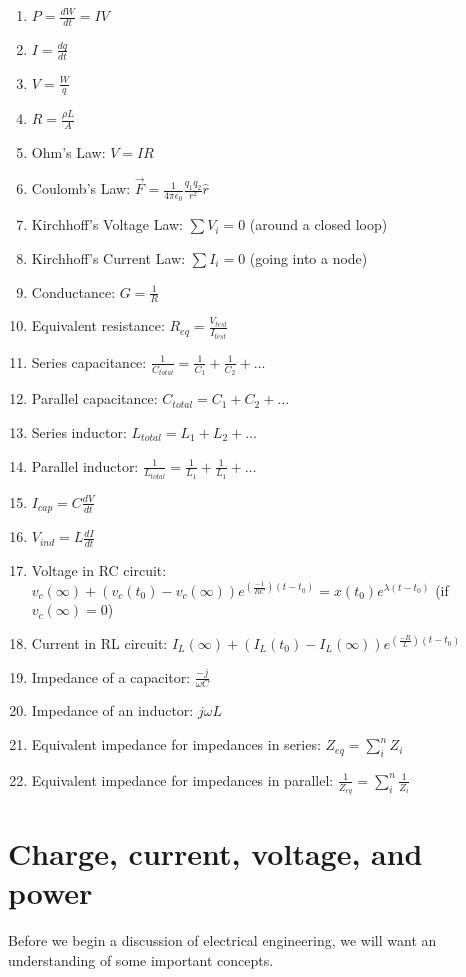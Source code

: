 \documentclass[nobib]{tufte-handout}
\begin{document}
\begin{enumerate}
    \item $P = \frac{dW}{dt} = IV$
    \item $I = \frac{dq}{dt}$
    \item $V = \frac{W}{q}$
    \item $R = \frac{\rho L}{A}$
    \item Ohm's Law: $V=IR$
    \item Coulomb's Law: $\vec{F} = \frac{1}{4\pi \epsilon_0}\frac{q_1 q_2}{r^2}\hat{r}$
    \item Kirchhoff's Voltage Law: $\sum V_i = 0$ (around a closed loop)
    \item Kirchhoff's Current Law: $\sum I_i = 0$ (going into a node)
    \item Conductance: $G = \frac{1}{R}$
    \item Equivalent resistance: $R_{eq} = \frac{V_{test}}{I_{test}}$
    \item Series capacitance: $\frac{1}{C_{total}} = \frac{1}{C_1} + \frac{1}{C_2} + \dots$
    \item Parallel capacitance: $C_{total} = C_1 + C_2 + \dots$
    \item Series inductor: $L_{total} = L_1+L_2+\dots$
    \item Parallel inductor: $\frac{1}{L_{total}} = \frac{1}{L_1} + \frac{1}{L_1} + \dots$
    \item $I_{cap} = C \frac{dV}{dt}$
    \item $V_{ind} = L \frac{dI}{dt}$
    \item Voltage in RC circuit: 
    $v_c(\infty) +\left(v_c(t_0) - v_c(\infty)\right)e^{(\frac{-1}{RC})(t - t_0)} = x(t_0)e^{\lambda (t-t_0)}$
    (if $v_c(\infty) = 0$)
    \item Current in RL circuit: $I_L(\infty) +\left(I_L(t_0) - I_L(\infty)\right)e^{(\frac{-R}{L})(t - t_0)}$
    \item Impedance of a capacitor: $\frac{-j}{\omega C}$
    \item Impedance of an inductor: $j \omega L$
    \item Equivalent impedance for impedances in series: $Z_{eq} = \sum_{i}^{n} Z_i$
    \item Equivalent impedance for impedances in parallel: $\frac{1}{Z_{eq}} = \sum_{i}^{n} \frac{1}{Z_i}$

\end{enumerate}

\pagebreak 

\section{Charge, current, voltage, and power}
Before we begin a discussion
of electrical engineering, we will want an
understanding of some important concepts. 
\end{document}
